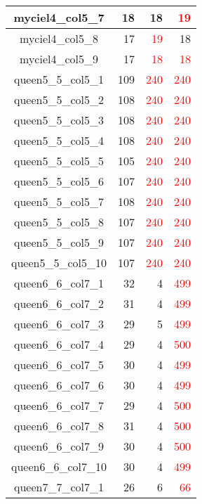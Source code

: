 \begin{longtable}{|c|r|r|r|}
  myciel4\_col5\_7 & 18 & 18 & \textcolor{red}{19} \\ \hline
  myciel4\_col5\_8 & 17 & \textcolor{red}{19} & 18 \\ \hline
  myciel4\_col5\_9 & 17 & \textcolor{red}{18} & \textcolor{red}{18} \\ \hline
  queen5\_5\_col5\_1 & 109 & \textcolor{red}{240} & \textcolor{red}{240} \\ \hline
  queen5\_5\_col5\_2 & 108 & \textcolor{red}{240} & \textcolor{red}{240} \\ \hline
  queen5\_5\_col5\_3 & 108 & \textcolor{red}{240} & \textcolor{red}{240} \\ \hline
  queen5\_5\_col5\_4 & 108 & \textcolor{red}{240} & \textcolor{red}{240} \\ \hline
  queen5\_5\_col5\_5 & 105 & \textcolor{red}{240} & \textcolor{red}{240} \\ \hline
  queen5\_5\_col5\_6 & 107 & \textcolor{red}{240} & \textcolor{red}{240} \\ \hline
  queen5\_5\_col5\_7 & 108 & \textcolor{red}{240} & \textcolor{red}{240} \\ \hline
  queen5\_5\_col5\_8 & 107 & \textcolor{red}{240} & \textcolor{red}{240} \\ \hline
  queen5\_5\_col5\_9 & 107 & \textcolor{red}{240} & \textcolor{red}{240} \\ \hline
  queen5\_5\_col5\_10 & 107 & \textcolor{red}{240} & \textcolor{red}{240} \\ \hline
  queen6\_6\_col7\_1 & 32 & 4 & \textcolor{red}{499} \\ \hline
  queen6\_6\_col7\_2 & 31 & 4 & \textcolor{red}{499} \\ \hline
  queen6\_6\_col7\_3 & 29 & 5 & \textcolor{red}{499} \\ \hline
  queen6\_6\_col7\_4 & 29 & 4 & \textcolor{red}{500} \\ \hline
  queen6\_6\_col7\_5 & 30 & 4 & \textcolor{red}{499} \\ \hline
  queen6\_6\_col7\_6 & 30 & 4 & \textcolor{red}{499} \\ \hline
  queen6\_6\_col7\_7 & 29 & 4 & \textcolor{red}{500} \\ \hline
  queen6\_6\_col7\_8 & 31 & 4 & \textcolor{red}{500} \\ \hline
  queen6\_6\_col7\_9 & 30 & 4 & \textcolor{red}{500} \\ \hline
  queen6\_6\_col7\_10 & 30 & 4 & \textcolor{red}{499} \\ \hline
  queen7\_7\_col7\_1 & 26 & 6 & \textcolor{red}{66} \\ \hline

\end{longtable}
